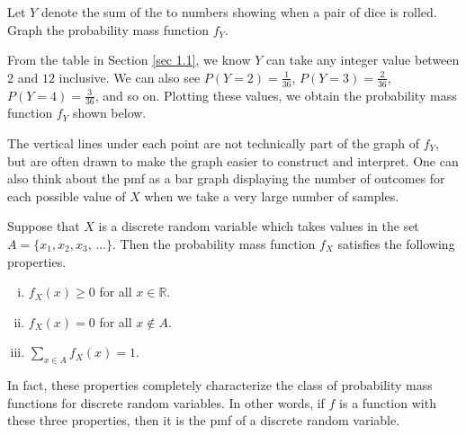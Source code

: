 \begin{examp} Let $Y$ denote the sum of the to numbers showing when a pair of dice is rolled. Graph the probability mass function $f_Y$.
\par
\noindent
From the table in Section \ref{sec 1.1}, we know $Y$ can take any integer value between $2$ and $12$ inclusive. We can also see $P(Y = 2) = \frac{1}{36}$, $P(Y = 3) = \frac{2}{36}$, $P(Y = 4) = \frac{3}{36}$, and so on. Plotting these values, we obtain the probability mass function $f_Y$ shown below.
\begin{center}
\end{center}
\end{examp} 
\par
The vertical lines under each point are not technically part of the graph of $f_Y$, but are often drawn to make the graph easier to construct and interpret. One can also think about the pmf as a bar graph displaying the number of outcomes for each possible value of $X$ when we take a very large number of samples.
\par
\begin{prop}\label{pmfproperties} Suppose that $X$ is a discrete random variable which takes values in the set $A = \{x_1, x_2, x_3, \, ...\}$. Then the probability mass function $f_X$ satisfies the following properties.
\vspace{-0.5em}
\begin{enumerate}[(i)]
\item $f_X(x) \geq 0$ for all $x \in \mathbb{R}$.
\item $f_X(x) = 0$ for all $x \not\in A$.
\item $\sum_{x \in A} f_X(x) = 1$.
\end{enumerate}
\end{prop}
\par
In fact, these properties completely characterize the class of probability mass functions for discrete random variables. In other words, if $f$ is a function with these three properties, then it is the pmf of a discrete random variable.

